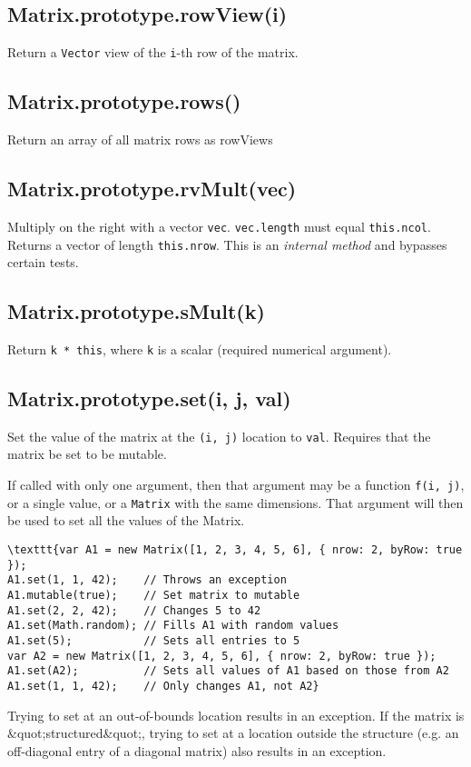 \documentclass{article}
\begin{document}
    \subsection*{Matrix.prototype.rowView(i)}
    Return a \texttt{Vector} view of the \texttt{i}-th row of the matrix.


    \subsection*{Matrix.prototype.rows()}
    Return an array of all matrix rows as rowViews


    \subsection*{Matrix.prototype.rvMult(vec)}
    Multiply on the right with a vector \texttt{vec}. \texttt{vec.length} must equal \texttt{this.ncol}.
Returns a vector of length \texttt{this.nrow}. This is an \emph{internal method} and bypasses certain tests.


    \subsection*{Matrix.prototype.sMult(k)}
    Return \texttt{k * this}, where \texttt{k} is a scalar (required numerical argument).


    \subsection*{Matrix.prototype.set(i, j, val)}
    Set the value of the matrix at the \texttt{(i, j)} location to \texttt{val}. Requires that
the matrix be set to be mutable.


If called with only one argument, then that argument may be a function \texttt{f(i, j)}, or
a single value, or a \texttt{Matrix} with the same dimensions. That argument will then be used
to set all the values of the Matrix.


\begin{lstlisting}
\texttt{var A1 = new Matrix([1, 2, 3, 4, 5, 6], { nrow: 2, byRow: true });
A1.set(1, 1, 42);    // Throws an exception
A1.mutable(true);    // Set matrix to mutable
A1.set(2, 2, 42);    // Changes 5 to 42
A1.set(Math.random); // Fills A1 with random values
A1.set(5);           // Sets all entries to 5
var A2 = new Matrix([1, 2, 3, 4, 5, 6], { nrow: 2, byRow: true });
A1.set(A2);          // Sets all values of A1 based on those from A2
A1.set(1, 1, 42);    // Only changes A1, not A2}\end{lstlisting}
Trying to set at an out-of-bounds location results in an exception. If the matrix is
\&quot;structured\&quot;, trying to set at a location outside the structure (e.g. an off-diagonal
entry of a diagonal matrix) also results in an exception.
\end{document}
